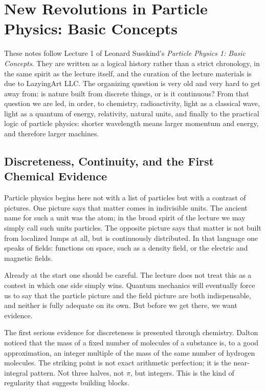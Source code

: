 \chapter{New Revolutions in Particle Physics: Basic Concepts}

These notes follow Lecture 1 of Leonard Susskind's \emph{Particle Physics 1: Basic Concepts}. They are written as a logical history rather than a strict chronology, in the same spirit as the lecture itself, and the curation of the lecture materials is due to LazyingArt LLC. The organizing question is very old and very hard to get away from: is nature built from discrete things, or is it continuous? From that question we are led, in order, to chemistry, radioactivity, light as a classical wave, light as a quantum of energy, relativity, natural units, and finally to the practical logic of particle physics: shorter wavelength means larger momentum and energy, and therefore larger machines.

\section{Discreteness, Continuity, and the First Chemical Evidence}

Particle physics begins here not with a list of particles but with a contrast of pictures. One picture says that matter comes in indivisible units. The ancient name for such a unit was the atom; in the broad spirit of the lecture we may simply call such units particles. The opposite picture says that matter is not built from localized lumps at all, but is continuously distributed. In that language one speaks of fields: functions on space, such as a density field, or the electric and magnetic fields.

Already at the start one should be careful. The lecture does not treat this as a contest in which one side simply wins. Quantum mechanics will eventually force us to say that the particle picture and the field picture are both indispensable, and neither is fully adequate on its own. But before we get there, we want evidence.

The first serious evidence for discreteness is presented through chemistry. Dalton noticed that the mass of a fixed number of molecules of a substance is, to a good approximation, an integer multiple of the mass of the same number of hydrogen molecules. The striking point is not exact arithmetic perfection; it is the near-integral pattern. Not three halves, not \(\pi\), but integers. This is the kind of regularity that suggests building blocks.

